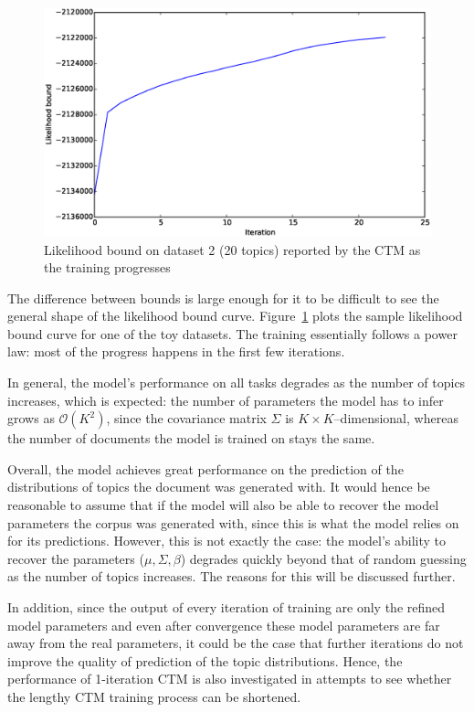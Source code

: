 \documentclass[12pt,a4paper,twoside,openright]{report}
\begin{document}
\begin{figure}[!htb]
\includegraphics[width=\textwidth]{sim-likelihood-bounds-k-20.eps}
\caption{Likelihood bound on dataset 2 (20 topics) reported by the CTM as the training progresses}
\label{fig:sim-likelihood-bounds-k-20}
\end{figure}

The difference between bounds is large enough for it to be difficult to see the general shape of the likelihood bound curve. Figure~\ref{fig:sim-likelihood-bounds-k-20} plots the sample likelihood bound curve for one of the toy datasets. The training essentially follows a power law: most of the progress happens in the first few iterations.

In general, the model's performance on all tasks degrades as the number of topics increases, which is expected: the number of parameters the model has to infer grows as $\mathcal{O}(K^2)$, since the covariance matrix $\Sigma$ is $K \times K$--dimensional, whereas the number of documents the model is trained on stays the same.

Overall, the model achieves great performance on the prediction of the distributions of topics the document was generated with. It would hence be reasonable to assume that if the model will also be able to recover the model parameters the corpus was generated with, since this is what the model relies on for its predictions. However, this is not exactly the case: the model's ability to recover the parameters ($\mu, \Sigma, \beta$) degrades quickly beyond that of random guessing as the number of topics increases. The reasons for this will be discussed further.

In addition, since the output of every iteration of training are only the refined model parameters and even after convergence these model parameters are far away from the real parameters, it could be the case that further iterations do not improve the quality of prediction of the topic distributions. Hence, the performance of 1-iteration CTM is also investigated in attempts to see whether the lengthy CTM training process can be shortened.
\end{document}
